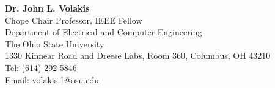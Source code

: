 \documentclass[overlapped,line,letterpaper]{res1}
\begin{document}
\begin{resume}
\medskip
{\bf Dr. John L. Volakis} \\ %
Chope Chair Professor, IEEE Fellow  \\
Department of Electrical and Computer Engineering \\
The Ohio State University \\
1330 Kinnear Road and Dreese Labs, Room 360, Columbus, OH 43210 \\
Tel: (614) 292-5846 \\
Email: volakis.1@osu.edu










\end{resume}
\end{document}
